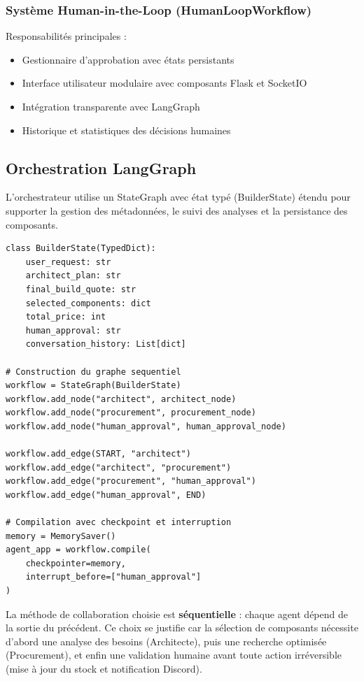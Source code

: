 \documentclass[12pt,a4paper]{article}
\begin{document}
\subsubsection{Syst\`eme Human-in-the-Loop (HumanLoopWorkflow)}
Responsabilit\'es principales :
\begin{itemize}
    \item Gestionnaire d'approbation avec \'etats persistants
    \item Interface utilisateur modulaire avec composants Flask et SocketIO
    \item Int\'egration transparente avec LangGraph
    \item Historique et statistiques des d\'ecisions humaines
\end{itemize}

\subsection{Orchestration LangGraph}
L'orchestrateur utilise un StateGraph avec \'etat typ\'e (BuilderState) \'etendu pour supporter la gestion des m\'etadonn\'ees, le suivi des analyses et la persistance des composants.

\begin{lstlisting}[caption={D\'efinition du workflow LangGraph (graph.py)}]
class BuilderState(TypedDict):
    user_request: str
    architect_plan: str
    final_build_quote: str
    selected_components: dict
    total_price: int
    human_approval: str
    conversation_history: List[dict]

# Construction du graphe sequentiel
workflow = StateGraph(BuilderState)
workflow.add_node("architect", architect_node)
workflow.add_node("procurement", procurement_node)
workflow.add_node("human_approval", human_approval_node)

workflow.add_edge(START, "architect")
workflow.add_edge("architect", "procurement")
workflow.add_edge("procurement", "human_approval")
workflow.add_edge("human_approval", END)

# Compilation avec checkpoint et interruption
memory = MemorySaver()
agent_app = workflow.compile(
    checkpointer=memory,
    interrupt_before=["human_approval"]
)
\end{lstlisting}

La m\'ethode de collaboration choisie est \textbf{s\'equentielle} : chaque agent d\'epend de la sortie du pr\'ec\'edent. Ce choix se justifie car la s\'election de composants n\'ecessite d'abord une analyse des besoins (Architecte), puis une recherche optimis\'ee (Procurement), et enfin une validation humaine avant toute action irr\'eversible (mise \`a jour du stock et notification Discord).
\end{document}
